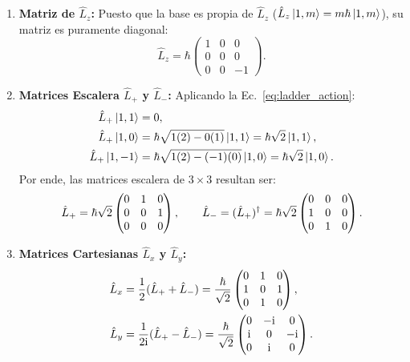 \begin{enumerate}
    \item \textbf{Matriz de $\hat{L}_z$:} Puesto que la base es propia de $\hat{L}_z$ ($\hat{L}_z\left| 1, m \right\rangle = m\hbar\left| 1, m \right\rangle$), su matriz es puramente diagonal:
    \begin{equation}
        \hat{L}_z = \hbar \begin{pmatrix} 1 & 0 & 0 \\ 0 & 0 & 0 \\ 0 & 0 & -1 \end{pmatrix}.
        \label{eq:matrix_lz_1}
    \end{equation}
    \item \textbf{Matrices Escalera $\hat{L}_+$ y $\hat{L}_-$:} Aplicando la Ec.~\eqref{eq:ladder_action}:
    \begin{align}
        \hat{L}_+\left| 1, 1 \right\rangle &= 0, \\
        \hat{L}_+\left| 1, 0 \right\rangle &= \hbar\sqrt{1(2) - 0(1)}\left| 1, 1 \right\rangle = \hbar\sqrt{2}\left| 1, 1 \right\rangle, \\
        \hat{L}_+\left| 1, -1 \right\rangle &= \hbar\sqrt{1(2) - (-1)(0)}\left| 1, 0 \right\rangle = \hbar\sqrt{2}\left| 1, 0 \right\rangle.
    \end{align}
    Por ende, las matrices escalera de $3\times 3$ resultan ser:
    \begin{equation}
        \hat{L}_+ = \hbar\sqrt{2}\begin{pmatrix} 0 & 1 & 0 \\ 0 & 0 & 1 \\ 0 & 0 & 0 \end{pmatrix}, \qquad \hat{L}_- = (\hat{L}_+)^\dagger = \hbar\sqrt{2}\begin{pmatrix} 0 & 0 & 0 \\ 1 & 0 & 0 \\ 0 & 1 & 0 \end{pmatrix}.
        \label{eq:matrix_ladder_1}
    \end{equation}
    \item \textbf{Matrices Cartesianas $\hat{L}_x$ y $\hat{L}_y$:}
    \begin{align}
        \hat{L}_x &= \frac{1}{2}(\hat{L}_+ + \hat{L}_-) = \frac{\hbar}{\sqrt{2}}\begin{pmatrix} 0 & 1 & 0 \\ 1 & 0 & 1 \\ 0 & 1 & 0 \end{pmatrix}, \label{eq:matrix_lx_1} \\
        \hat{L}_y &= \frac{1}{2\iu}(\hat{L}_+ - \hat{L}_-) = \frac{\hbar}{\sqrt{2}}\begin{pmatrix} 0 & -\iu & 0 \\ \iu & 0 & -\iu \\ 0 & \iu & 0 \end{pmatrix}. \label{eq:matrix_ly_1}

\end{align}
\end{enumerate}

